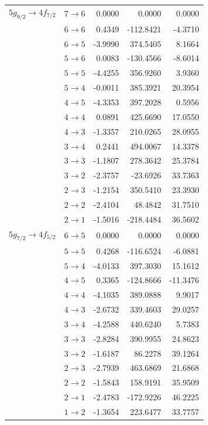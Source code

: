 \begin{longtable}{c c | r r r}
$5g_{9/2} \rightarrow 4f_{7/2}$ & $7 \rightarrow 6$ & 0.0000 & 0.0000 & 0.0000 \\
& $6 \rightarrow 6$ & 0.4349 & -112.8421 & -4.3710 \\
& $6 \rightarrow 5$ & -3.9990 & 374.5405 & 8.1664 \\
& $5 \rightarrow 6$ & 0.0083 & -130.4566 & -8.6014 \\
& $5 \rightarrow 5$ & -4.4255 & 356.9260 & 3.9360 \\
& $5 \rightarrow 4$ & -0.0011 & 385.3921 & 20.3954 \\
& $4 \rightarrow 5$ & -4.3353 & 397.2028 & 0.5956 \\
& $4 \rightarrow 4$ & 0.0891 & 425.6690 & 17.0550 \\
& $4 \rightarrow 3$ & -1.3357 & 210.0265 & 28.0955 \\
& $3 \rightarrow 4$ & 0.2441 & 494.0067 & 14.3378 \\
& $3 \rightarrow 3$ & -1.1807 & 278.3642 & 25.3784 \\
& $3 \rightarrow 2$ & -2.3757 & -23.6926 & 33.7363 \\
& $2 \rightarrow 3$ & -1.2154 & 350.5410 & 23.3930 \\
& $2 \rightarrow 2$ & -2.4104 & 48.4842 & 31.7510 \\
& $2 \rightarrow 1$ & -1.5016 & -218.4484 & 36.5602 \\[7pt]
$5g_{7/2} \rightarrow 4f_{5/2}$ & $6 \rightarrow 5$ & 0.0000 & 0.0000 & 0.0000 \\
& $5 \rightarrow 5$ & 0.4268 & -116.6524 & -6.0881 \\
& $5 \rightarrow 4$ & -4.0133 & 397.3030 & 15.1612 \\
& $4 \rightarrow 5$ & 0.3365 & -124.8666 & -11.3476 \\
& $4 \rightarrow 4$ & -4.1035 & 389.0888 & 9.9017 \\
& $4 \rightarrow 3$ & -2.6732 & 339.4603 & 29.0257 \\
& $3 \rightarrow 4$ & -4.2588 & 440.6240 & 5.7383 \\
& $3 \rightarrow 3$ & -2.8284 & 390.9955 & 24.8623 \\
& $3 \rightarrow 2$ & -1.6187 & 86.2278 & 39.1264 \\
& $2 \rightarrow 3$ & -2.7939 & 463.6869 & 21.6868 \\
& $2 \rightarrow 2$ & -1.5843 & 158.9191 & 35.9509 \\
& $2 \rightarrow 1$ & -2.4783 & -172.9226 & 46.2225 \\
& $1 \rightarrow 2$ & -1.3654 & 223.6477 & 33.7757 \\

\end{longtable}
